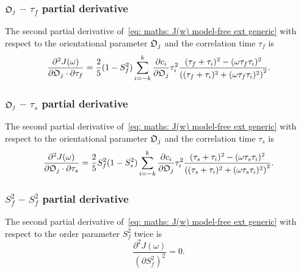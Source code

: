 \subsubsection{$\mathfrak{O}_j$ -- $\tau_f$ partial derivative}

The second partial derivative of~\eqref{eq: maths: J(w) model-free ext generic} with respect to the orientational parameter $\mathfrak{O}_j$ and the correlation time $\tau_f$ is
\begin{equation}
    \frac{\partial^2 J(\omega)}{\partial \mathfrak{O}_j \cdot \partial \tau_f} = \frac{2}{5} (1 - S^2_f) \sum_{i=-k}^k
        \frac{\partial c_i}{\partial \mathfrak{O}_j} \tau_i^2
        \frac{(\tau_f + \tau_i)^2 - (\omega \tau_f \tau_i)^2}{\left((\tau_f + \tau_i)^2 + (\omega \tau_f \tau_i)^2 \right)^2}.
\end{equation}



\subsubsection{$\mathfrak{O}_j$ -- $\tau_s$ partial derivative}

The second partial derivative of~\eqref{eq: maths: J(w) model-free ext generic} with respect to the orientational parameter $\mathfrak{O}_j$ and the correlation time $\tau_s$ is
\begin{equation}
    \frac{\partial^2 J(\omega)}{\partial \mathfrak{O}_j \cdot \partial \tau_s} = \frac{2}{5} S^2_f(1 - S^2_s) \sum_{i=-k}^k
        \frac{\partial c_i}{\partial \mathfrak{O}_j} \tau_i^2
        \frac{(\tau_s + \tau_i)^2 - (\omega \tau_s \tau_i)^2}{\left((\tau_s + \tau_i)^2 + (\omega \tau_s \tau_i)^2 \right)^2}.
\end{equation}



\subsubsection{$S^2_f$ -- $S^2_f$ partial derivative}

The second partial derivative of~\eqref{eq: maths: J(w) model-free ext generic} with respect to the order parameter $S^2_f$ twice is
\begin{equation}
    \frac{\partial^2 J(\omega)}{(\partial S^2_f)^2} = 0.
\end{equation}



